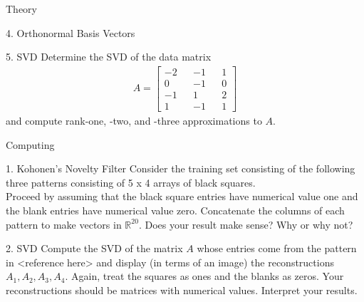 \begin{section}{Theory}
\begin{homeworkSection}{4. Orthonormal Basis Vectors}
\end{homeworkSection}

\begin{homeworkSection}{5. SVD}
Determine the SVD of the data matrix
\begin{align*}
    A = \begin{bmatrix} -2 && -1 && 1 \\ 0 && -1 && 0 \\ -1 && 1 && 2 \\ 1 && -1 && 1 \end{bmatrix}
\end{align*}
and compute rank-one, -two, and -three approximations to $A$.
\end{homeworkSection}

\end{section}

\begin{section}{Computing}

\begin{homeworkSection}{1. Kohonen's Novelty Filter }
Consider the training set consisting of the following three patterns consisting of 5 x 4 arrays of black squares.
\\

Proceed by assuming that the black square entries have numerical value one and the blank entries have numerical value zero. Concatenate the columns of each pattern to make vectors in $\mathbb{R}^{20}$. Does your result make sense? Why or why not?


\end{homeworkSection}


\begin{homeworkSection}{2. SVD}
Compute the SVD of the matrix $A$ whose entries come from the pattern in <reference here> and display (in terms of an image) the reconstructions $A_1, A_2, A_3, A_4$. Again, treat the squares as ones and the blanks as zeros. Your reconstructions should be matrices with numerical values. Interpret your results.

\end{homeworkSection}

\end{section}


